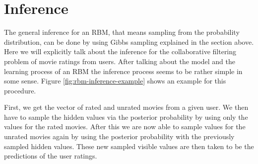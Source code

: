 \documentclass[crop=false,10pt]{standalone}
\begin{document}
  \section{Inference} %
  \label{sec:Inference}
    The general inference for an RBM, that means sampling from the probability distribution, can be done by using Gibbs sampling explained in the section above.
    Here we will explicitly talk about the inference for the collaborative filtering problem of movie ratings from users.
    After talking about the model and the learning process of an RBM the inference process seems to be rather simple in some sense.
    Figure \ref{fig:rbm-inference-example} shows an example for this procedure.

    First, we get the vector of rated and unrated movies from a given user.
    We then have to sample the hidden values via the posterior probability by using only the values for the rated movies.
    After this we are now able to sample values for the unrated movies again by using the posterior probability with the previously sampled hidden values.
    These new sampled visible values are then taken to be the predictions of the user ratings.
\end{document}
